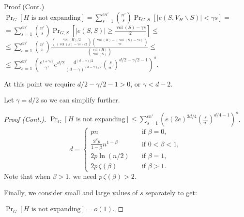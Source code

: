 \documentclass{beamer}
\DeclareMathOperator*{\vol}{vol}
\newcommand{\autotitle}{\secname\ifdefempty{\subsecname}{}{~--- \subsecname}}
\begin{document}
\begin{frame}{\autotitle}
    \small
    \begin{block}{Proof (Cont.)}
        $\Pr_G[H\text{ is not expanding}]
        =\sum_{s=1}^{\epsilon n'}{
            \binom{n'}{s}
            \Pr_{G,S}[|e(S,V_H\backslash S)| < \gamma s]
        }=$
        $=\sum_{s=1}^{\epsilon n'}{
            \binom{n'}{s}
            \Pr_{G,S}\left[|e(S,S)|\geq\frac{\vol(S)-\gamma s}{2}\right]
        }\leq$
        $\leq\sum_{s=1}^{\epsilon n'}{
            \binom{n'}{s}
            \frac{\binom{\vol(H)/2}{(\vol(S)-\gamma s)/2}\binom{\vol(H)-(\vol(S)-\gamma s)}{\gamma s}}{\binom{\vol(H)}{\vol(S)}}
        }\leq$
        $\leq\sum_{s=1}^{\epsilon n'}{\left(
            \frac{e^{1+\gamma/2}}{\gamma^\gamma}
            e^{d/2}
            \frac{d^{(d+\gamma)/2}}{(d-\gamma)^{(d-\gamma)/2}}
            \left(\frac{s}{n'}\right)^{d/2-\gamma/2-1}
        \right)^s}$.

        At this point we require $d/2-\gamma/2-1>0$, or $\gamma<d-2$.
        
        Let $\gamma=d/2$ so we can simplify further.
    \end{block}
\end{frame}

\begin{frame}{\autotitle}
    \small
    \begin{proof}[Proof (Cont.)]
        $\Pr_G[H\text{ is not expanding}]
        \leq\sum_{s=1}^{\epsilon n'}{\left(
            e
            (2e)^{3d/4}
            \left(\frac{s}{n'}\right)^{d/4-1}
        \right)^s}$.
    \begin{equation*}
        d=
        \begin{cases}
            pn & \quad \text{if } \beta=0,\\
            \frac{2^\beta p}{1-\beta}n^{1-\beta} & \quad \text{if } 0<\beta<1,\\
            2p\ln(n/2) & \quad \text{if } \beta=1,\\
            2p\,\zeta(\beta) & \quad \text{if } \beta>1.
        \end{cases}
    \end{equation*}
    Note that when $\beta>1$, we need $p\,\zeta(\beta)>2$.
    
    Finally, we consider small and large values of $s$ separately to get:
    
    $\Pr_G[H\text{ is not expanding}]=o(1)$.
    \end{proof}
\end{frame}
\end{document}
